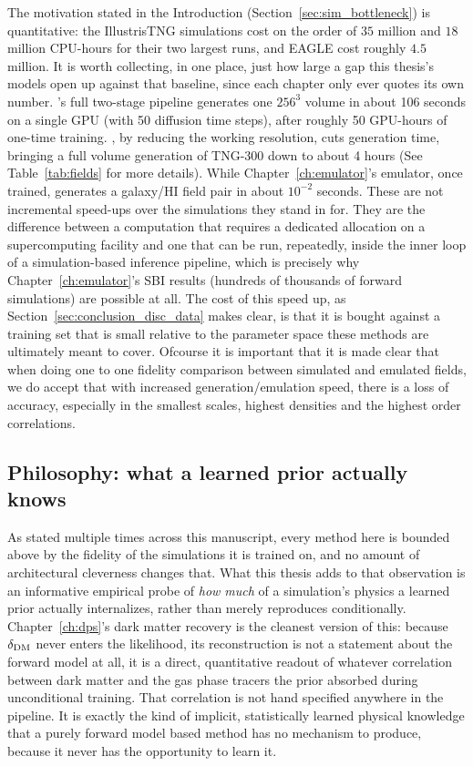 The motivation stated in the Introduction (Section~\ref{sec:sim_bottleneck}) is quantitative: the IllustrisTNG simulations cost on the order of $35$ million and $18$ million CPU-hours for their two largest runs, and EAGLE cost roughly $4.5$ million. It is worth collecting, in one place, just how large a gap this thesis's models open up against that baseline, since each chapter only ever quotes its own number. \LODI's full two-stage pipeline generates one $256^3$ volume in about 106 seconds on a single GPU (with 50 diffusion time steps), after roughly 50 GPU-hours of one-time training. \FOLD, by reducing the working resolution, cuts generation time, bringing a full volume generation of TNG-300 down to about 4 hours (See Table~\ref{tab:fields} for more details). While Chapter~\ref{ch:emulator}'s emulator, once trained, generates a galaxy/HI field pair in about $10^{-2}$ seconds. These are not incremental speed-ups over the simulations they stand in for. They are the difference between a computation that requires a dedicated allocation on a supercomputing facility and one that can be run, repeatedly, inside the inner loop of a simulation-based inference pipeline, which is precisely why Chapter~\ref{ch:emulator}'s SBI results (hundreds of thousands of forward simulations) are possible at all. The cost of this speed up, as Section~\ref{sec:conclusion_disc_data} makes clear, is that it is bought against a training set that is small relative to the parameter space these methods are ultimately meant to cover. Ofcourse it is important that it is made clear that when doing one to one fidelity comparison between simulated and emulated fields, we do accept that with increased generation/emulation speed, there is a loss of accuracy, especially in the smallest scales, highest densities and the highest order correlations.

\subsection{Philosophy: what a learned prior actually knows}
\label{sec:conclusion_disc_philosophy}

As stated multiple times across this manuscript, every method here is bounded above by the fidelity of the simulations it is trained on, and no amount of architectural cleverness changes that. What this thesis adds to that observation is an informative empirical probe of \emph{how much} of a simulation's physics a learned prior actually internalizes, rather than merely reproduces conditionally. Chapter~\ref{ch:dps}'s dark matter recovery is the cleanest version of this: because $\delta_{\rm DM}$ never enters the likelihood, its reconstruction is not a statement about the forward model at all, it is a direct, quantitative readout of whatever correlation between dark matter and the gas phase tracers the prior absorbed during unconditional training. That correlation is not hand specified anywhere in the pipeline. It is exactly the kind of implicit, statistically learned physical knowledge that a purely forward model based method has no mechanism to produce, because it never has the opportunity to learn it.

